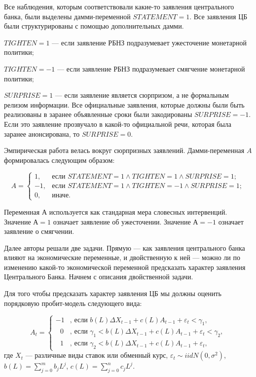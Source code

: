 \documentclass[14pt,a4paper, oneside]{extreport}
\theoremstyle{plain}              %
\theoremstyle{definition}         %
\begin{document}
Все наблюдения, которым соответствовали какие-то заявления центрального банка, были выделены дамми-переменной $STATEMENT = 1$. Все заявления ЦБ были структурированы с помощью дополнительных дамми.

$TIGHTEN=1$ --- если заявление РБНЗ подразумевает ужесточение монетарной политики;

$TIGHTEN=-1$ ---  если заявление РБНЗ подразумевает смягчение монетарной политики;

$SURPRISE = 1$ ---  если заявление является сюрпризом, а не формальным релизом информации. Все официальные заявления, которые должны были быть реализованы в заранее объявленные сроки были закодированы $SURPRISE = -1$. Если это заявление прозвучало в какой-то официальной речи, которая была заранее анонсирована, то $SURPRISE = 0$. 

Эмпирическая работа велась вокруг сюрпризных заявлений. Дамми-переменная $A$ формировалась следующим образом:

\begin{equation}
A = \begin{cases}
1,&\text{если } STATEMENT=1 \wedge TIGHTEN=1 \wedge SURPRISE =1;\\
-1,&\text{если }  STATEMENT=1 \wedge TIGHTEN=-1 \wedge SURPRISE =1;\\
0,&\text{иначе.}
\end{cases}
\end{equation}

Переменная А используется как стандарная мера словесных интервенций. Значение $А=1$ означает заявление об ужесточении. Значение  $А= -1$ означает заявление о смягчении.  

Далее авторы решали две задачи. Прямую --- как заявления центрального банка влияют на экономические переменные, и двойственную к ней --- можно ли по изменению какой-то экономической переменной предсказать характер заявления Центрального Банка. Начнем с описания двойственной задачи.

 Для того чтобы предсказать характер заявления ЦБ мы должны оценить порядковую пробит-модель следующего вида:

\begin{equation}
A_t = \begin{cases} -1 &\text{, если } b(L) \Delta X_{t-1} + c(L) A_{t-1} + \varepsilon_t < \gamma_1, \\
\mbox{ }0 &\text{, если } \gamma_1 < b(L) \Delta X_{t-1} + c(L) A_{t-1} + \varepsilon_t < \gamma_2, \\
\mbox{ }1 &\text{, если } \gamma_2 < b(L) \Delta X_{t-1} + c(L) A_{t-1} + \varepsilon_t, 
\end{cases}
\end{equation} где $X_{t}$ --- различные виды ставок или обменный курс, $\varepsilon_t \sim iid N (0, \sigma^2)$, $b(L) = \sum_{j=0}^m b_j L^j$, $c(L) = \sum_{j=0}^n c_j L^j$. 
\end{document}
